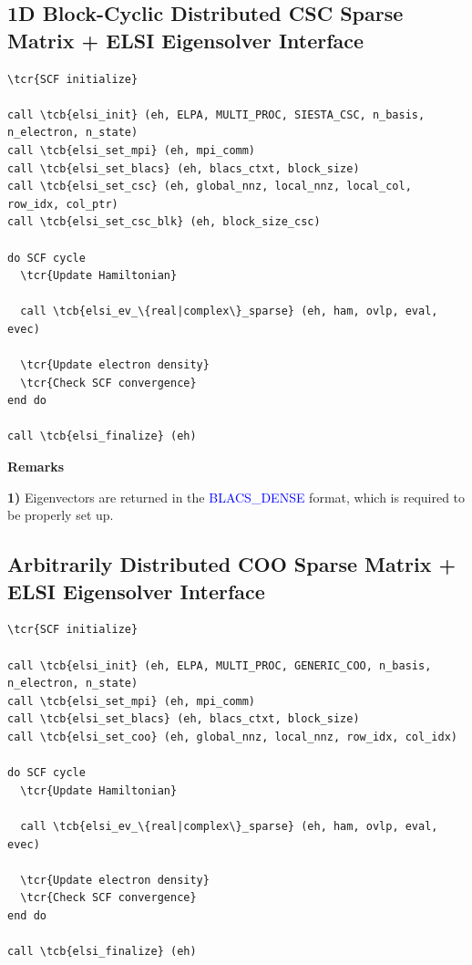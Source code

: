 \documentclass{report}
\newcommand{\tcb}[1]{\textcolor{blue}{#1}}
\newcommand{\tcr}[1]{\textcolor{red}{#1}}
\begin{document}
\subsection*{1D Block-Cyclic Distributed CSC Sparse Matrix + ELSI Eigensolver Interface}
\begin{tcolorbox}
\begin{Verbatim}[commandchars=\\\{\}]
\tcr{SCF initialize}

call \tcb{elsi_init} (eh, ELPA, MULTI_PROC, SIESTA_CSC, n_basis, n_electron, n_state)
call \tcb{elsi_set_mpi} (eh, mpi_comm)
call \tcb{elsi_set_blacs} (eh, blacs_ctxt, block_size)
call \tcb{elsi_set_csc} (eh, global_nnz, local_nnz, local_col, row_idx, col_ptr)
call \tcb{elsi_set_csc_blk} (eh, block_size_csc)

do SCF cycle
  \tcr{Update Hamiltonian}

  call \tcb{elsi_ev_\{real|complex\}_sparse} (eh, ham, ovlp, eval, evec)

  \tcr{Update electron density}
  \tcr{Check SCF convergence}
end do

call \tcb{elsi_finalize} (eh)
\end{Verbatim}
\end{tcolorbox}

\textbf{Remarks}

\textbf{1)} Eigenvectors are returned in the \tcb{BLACS\_DENSE} format, which is required to be properly set up.

\subsection*{Arbitrarily Distributed COO Sparse Matrix + ELSI Eigensolver Interface}
\begin{tcolorbox}
\begin{Verbatim}[commandchars=\\\{\}]
\tcr{SCF initialize}

call \tcb{elsi_init} (eh, ELPA, MULTI_PROC, GENERIC_COO, n_basis, n_electron, n_state)
call \tcb{elsi_set_mpi} (eh, mpi_comm)
call \tcb{elsi_set_blacs} (eh, blacs_ctxt, block_size)
call \tcb{elsi_set_coo} (eh, global_nnz, local_nnz, row_idx, col_idx)

do SCF cycle
  \tcr{Update Hamiltonian}

  call \tcb{elsi_ev_\{real|complex\}_sparse} (eh, ham, ovlp, eval, evec)

  \tcr{Update electron density}
  \tcr{Check SCF convergence}
end do

call \tcb{elsi_finalize} (eh)
\end{Verbatim}
\end{tcolorbox}
\end{document}
